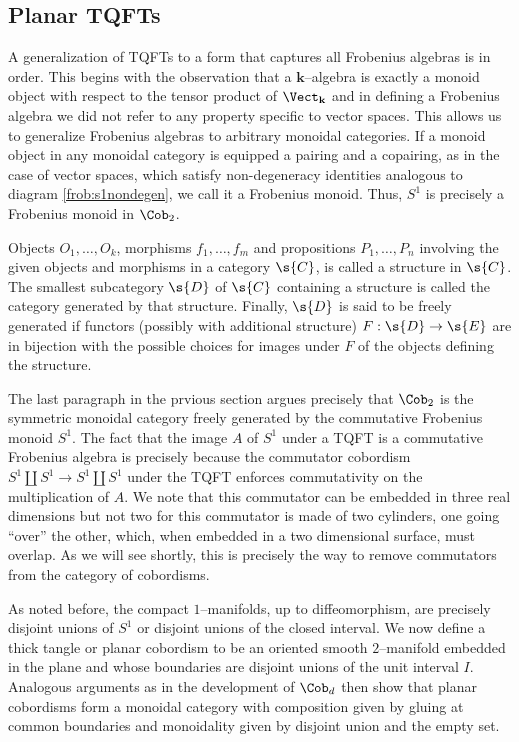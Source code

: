 
\subsection{Planar TQFTs}

A generalization of TQFTs to a form that captures all Frobenius algebras is in
order. This begins with the observation that a $\mathbf{k}$--algebra is exactly
a monoid object with respect to the tensor product of $\Vect_{\mathbf{k}}$ and
in defining a Frobenius algebra we did not refer to any property specific to
vector spaces. This allows us to generalize Frobenius algebras to arbitrary
monoidal categories. If a monoid object in any monoidal category is equipped a
pairing and a copairing, as in the case of vector spaces, which satisfy
non-degeneracy identities analogous to diagram \eqref{frob:s1nondegen}, we call
it a Frobenius monoid. Thus, $S^1$ is precisely a Frobenius monoid in $\Cob_2$.

\begin{defn}
Objects $O_1, \dots, O_k$, morphisms $f_1, \dots, f_m$ and propositions
$P_1, \dots, P_n$ involving the given objects and morphisms in a category
$\s{C}$, is called a structure in $\s{C}$. The smallest subcategory $\s{D}$ of
$\s{C}$ containing a structure is called the category generated by that
structure. Finally, $\s{D}$ is said to be freely generated if functors (possibly
with additional structure) $F : \s{D} \to \s{E}$ are in bijection with the
possible choices for images under $F$ of the objects defining the structure.
\end{defn}

The last paragraph in the prvious section argues precisely that $\Cob_2$ is the
symmetric monoidal category freely generated by the commutative Frobenius monoid
$S^1$. The fact that the image $A$ of $S^1$ under a TQFT is a commutative
Frobenius algebra is precisely because the commutator cobordism
$S^1 \amalg S^1 \to S^1 \amalg S^1$ under the TQFT enforces commutativity on the
multiplication of $A$. We note that this commutator can be embedded in three
real dimensions but not two for this commutator is made of two cylinders, one
going ``over'' the other, which, when embedded in a two dimensional surface,
must overlap. As we will see shortly, this is precisely the way to remove
commutators from the category of cobordisms.

As noted before, the compact $1$--manifolds, up to diffeomorphism, are precisely
disjoint unions of $S^1$ or disjoint unions of the closed interval. We now
define a thick tangle or planar cobordism to be an oriented smooth $2$--manifold
embedded in the plane and whose boundaries are disjoint unions of the unit
interval $I$.  Analogous arguments as in the development of $\Cob_d$ then show
that planar cobordisms form a monoidal category with composition given by gluing
at common boundaries and monoidality given by disjoint union and the empty set.

